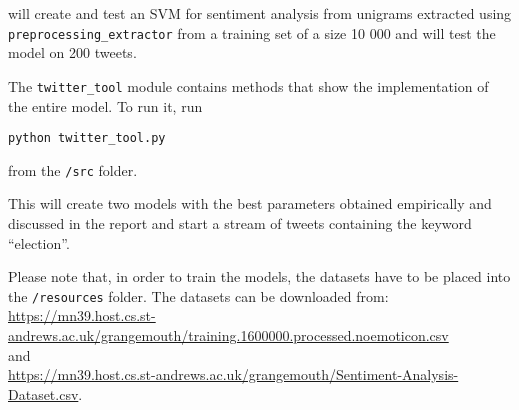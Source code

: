 will create and test an SVM for sentiment analysis from unigrams extracted using\\ \texttt{preprocessing\_extractor} from a training set of a size 10 000 and will test the model on 200 tweets.

The \texttt{twitter\_tool} module contains methods that show the implementation of the entire model. To run it, run
\begin{center}
\texttt{python twitter\_tool.py}
\end{center}
from the \texttt{/src} folder.

This will create two models with the best parameters obtained empirically and discussed in the report and start a stream of tweets containing the keyword ``election''. 

Please note that, in order to train the models, the datasets have to be placed into the \texttt{/resources} folder. The datasets can be downloaded from: \\
\url{https://mn39.host.cs.st-andrews.ac.uk/grangemouth/training.1600000.processed.noemoticon.csv}
\\and\\
\url{https://mn39.host.cs.st-andrews.ac.uk/grangemouth/Sentiment-Analysis-Dataset.csv}.

